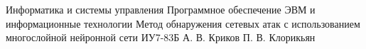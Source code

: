 \makethesistitle
{Информатика и системы управления}
{Программное обеспечение ЭВМ и информационные технологии}
{Метод обнаружения сетевых атак с использованием многослойной нейронной сети}
{ИУ7-83Б}
{А. В. Криков}
{П. В. Клорикьян}
{}
{}
{}